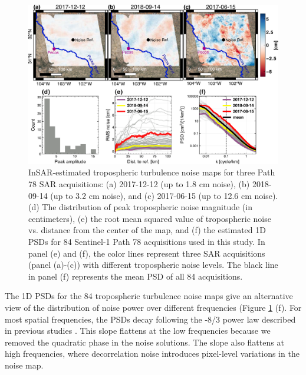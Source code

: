 \begin{figure}
	\centering 
	\includegraphics[width=0.98\linewidth]{figures/chapter6-blobs/figure5_noise_path78.pdf}
	\caption{
		InSAR-estimated tropospheric turbulence noise maps for three Path 78 SAR acquisitions: (a) 2017-12-12 (up to 1.8 cm noise), (b) 2018-09-14 (up to 3.2 cm noise), and (c) 2017-06-15  (up to 12.6 cm noise).
		(d) The distribution of peak tropospheric noise magnitude (in centimeters), (e) the root mean squared value of tropospheric noise vs. distance from the center of the map, and (f) the estimated 1D PSDs for 84 Sentinel-1 Path 78 acquisitions used in this study. In panel (e) and (f), the color lines represent three SAR acquisitions (panel (a)-(c)) with different tropospheric noise levels. The black line in panel (f) represents the mean PSD of all 84 acquisitions.}
	\label{fig:results-noise}
\end{figure}


The 1D PSDs for the 84 tropospheric turbulence noise maps give an alternative view of the distribution of noise power over different frequencies (Figure \ref{fig:results-noise} (f). For most spatial frequencies, the PSDs decay following the -8/3 power law described in previous studies \cite{Hanssen2001RadarInterferometryData, Onn2006ModelingWaterVapor}. This slope flattens at the low frequencies because we removed the quadratic phase in the noise solutions. The slope also flattens at high frequencies, where decorrelation noise introduces pixel-level variations in the noise map.



